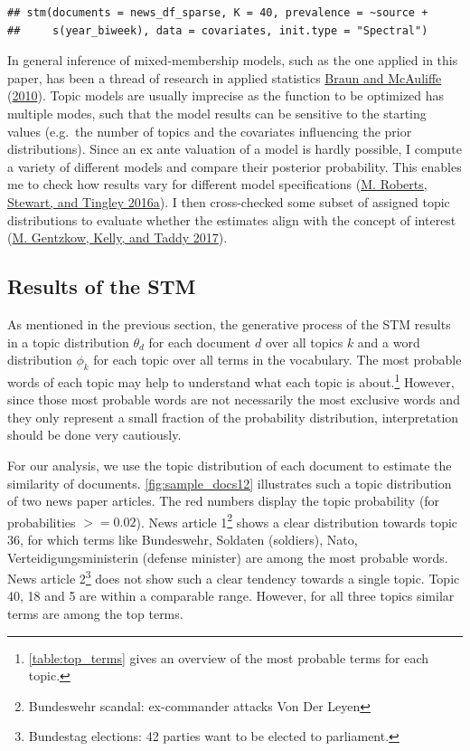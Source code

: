 \documentclass[
]{article}
\begin{document}
\begin{verbatim}
## stm(documents = news_df_sparse, K = 40, prevalence = ~source + 
##     s(year_biweek), data = covariates, init.type = "Spectral")
\end{verbatim}

In general inference of mixed-membership models, such as the one applied
in this paper, has been a thread of research in applied statistics
\protect\hyperlink{ref-braun_variational_2010}{Braun and McAuliffe}
(\protect\hyperlink{ref-braun_variational_2010}{2010}). Topic models are
usually imprecise as the function to be optimized has multiple modes,
such that the model results can be sensitive to the starting values
(e.g.~the number of topics and the covariates influencing the prior
distributions). Since an ex ante valuation of a model is hardly
possible, I compute a variety of different models and compare their
posterior probability. This enables me to check how results vary for
different model specifications
(\protect\hyperlink{ref-roberts_navigating_2016}{M. Roberts, Stewart,
and Tingley 2016a}). I then cross-checked some subset of assigned topic
distributions to evaluate whether the estimates align with the concept
of interest (\protect\hyperlink{ref-gentzkow_text_2017}{M. Gentzkow,
Kelly, and Taddy 2017}).

\hypertarget{results-of-the-stm}{%
\subsection{Results of the STM}\label{results-of-the-stm}}

As mentioned in the previous section, the generative process of the STM
results in a topic distribution \(\theta_d\) for each document \(d\)
over all topics \(k\) and a word distribution \(\phi_k\) for each topic
over all terms in the vocabulary. The most probable words of each topic
may help to understand what each topic is about.\footnote{\autoref{table:top_terms}
  gives an overview of the most probable terms for each topic.} However,
since those most probable words are not necessarily the most exclusive
words and they only represent a small fraction of the probability
distribution, interpretation should be done very cautiously.

For our analysis, we use the topic distribution of each document to
estimate the similarity of documents. \autoref{fig:sample_docs12}
illustrates such a topic distribution of two news paper articles. The
red numbers display the topic probability (for probabilities
\(>= 0.02\)). News article 1\footnote{Bundeswehr scandal: ex-commander
  attacks Von Der Leyen} shows a clear distribution towards topic 36,
for which terms like Bundeswehr, Soldaten (soldiers), Nato,
Verteidigungsministerin (defense minister) are among the most probable
words. News article 2\footnote{Bundestag elections: 42 parties want to
  be elected to parliament.} does not show such a clear tendency towards
a single topic. Topic 40, 18 and 5 are within a comparable range.
However, for all three topics similar terms are among the top terms.
\end{document}
